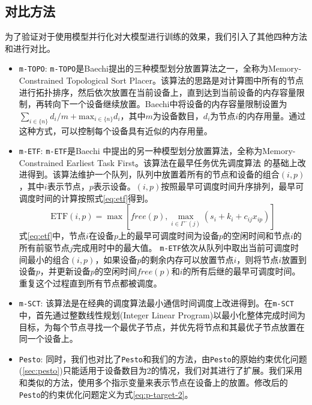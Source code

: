 \subsection{对比方法}
为了验证\sys{}对于使用模型并行化对大模型进行训练的效果，我们引入了其他四种方法和\sys{}进行对比。
\begin{itemize}
	\item \texttt{m-TOPO}: \texttt{m-TOPO}是Baechi提出的三种模型划分放置算法之一，全称为Memory-Constrained Topological Sort Placer。该算法的思路是对计算图中所有的节点进行拓扑排序，然后依次放置在当前设备上，直到达到当前设备的内存容量限制，再转向下一个设备继续放置。Baechi中将设备的内存容量限制设置为$\sum_{i\in\{n\}}d_i / m + \mathrm{max}_{i\in\{n\}} d_i$，其中$m$为设备数目，$d_i$为节点$i$的内存用量。通过这种方式，可以控制每个设备具有近似的内存用量。
	\item \texttt{m-ETF}: \texttt{m-ETF}是Baechi 中提出的另一种模型划分放置算法，全称为Memory-Constrained Earliest Task First。该算法在最早任务优先调度算法 的基础上改进得到。该算法维护一个队列，队列中放置着所有的节点和设备的组合$(i,p)$，其中$i$表示节点，$p$表示设备。$(i,p)$按照最早可调度时间升序排列，最早可调度时间的计算按照式\ref{eq:etf}得到。
	\begin{equation}
		\label{eq:etf}
		\mathrm{ETF}(i,p) = \max\left[\mathit{free(p)}, \max_{i\in \Gamma^- (j)}(s_i+k_i+c_{ij}x_{ip}) \right]
	\end{equation}
	式\ref{eq:etf}中，节点$i$在设备$p$上的最早可调度时间为设备$p$的空闲时间和节点$i$的所有前驱节点$j$完成用时中的最大值。
	\texttt{m-ETF}依次从队列中取出当前可调度时间最小的组合$(i,p)$，如果设备$p$的剩余内存可以放置节点$i$，则将节点$i$放置到设备$p$，并更新设备$p$的空闲时间$\mathit{free}(p)$和$i$的所有后继的最早可调度时间。重复这个过程直到所有节点都被调度。

	\item \texttt{m-SCT}: 该算法是在经典的调度算法最小通信时间调度上改进得到。在\texttt{m-SCT}中，首先通过整数线性规划(Integer Linear Program)以最小化整体完成时间为目标，为每个节点寻找一个最优子节点，并优先将节点和其最优子节点放置在同一个设备上。
	\item \texttt{Pesto}: 同时，我们也对比了\texttt{Pesto}和我们的方法，由\texttt{Pesto}的原始约束优化问题(\ref{sec:pesto})只能适用于设备数目为2的情况，我们对其进行了扩展。我们采用和\sys{}类似的方法，使用多个指示变量来表示节点在设备上的放置。修改后的\texttt{Pesto}的约束优化问题定义为式\ref{eq:p-target-2}。
\end{itemize}


